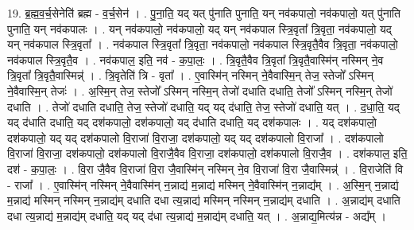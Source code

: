 \documentclass[17pt]{extarticle}
\begin{document}
19. ब्र॒ह्म॒व॒र्च॒सेनेति॑ ब्रह्म - व॒र्च॒सेन॑ । . पु॒ना॒ति॒ यद् यत् पु॑नाति पुनाति॒ यन् नव॑कपालो॒ नव॑कपालो॒ यत् पु॑नाति पुनाति॒ यन् नव॑कपालः । . यन् नव॑कपालो॒ नव॑कपालो॒ यद् यन् नव॑कपाल स्त्रि॒वृता᳚ त्रि॒वृता॒ नव॑कपालो॒ यद् यन् नव॑कपाल स्त्रि॒वृता᳚ । . नव॑कपाल स्त्रि॒वृता᳚ त्रि॒वृता॒ नव॑कपालो॒ नव॑कपाल स्त्रि॒वृतै॒वैव त्रि॒वृता॒ नव॑कपालो॒ नव॑कपाल स्त्रि॒वृतै॒व । . नव॑कपाल॒ इति॒ नव॑ - क॒पा॒लः॒ । . त्रि॒वृतै॒वैव त्रि॒वृता᳚ त्रि॒वृतै॒वास्मि॑न् नस्मिन् ने॒व त्रि॒वृता᳚ त्रि॒वृतै॒वास्मिन्न्॑ । . त्रि॒वृतेति॑ त्रि - वृता᳚ । . ए॒वास्मि॑न् नस्मिन् ने॒वैवास्मि॒न् तेज॒ स्तेजो᳚ ऽस्मिन् ने॒वैवास्मि॒न् तेजः॑ । . अ॒स्मि॒न् तेज॒ स्तेजो᳚ ऽस्मिन् नस्मि॒न् तेजो॑ दधाति दधाति॒ तेजो᳚ ऽस्मिन् नस्मि॒न् तेजो॑ दधाति । . तेजो॑ दधाति दधाति॒ तेज॒ स्तेजो॑ दधाति॒ यद् यद् द॑धाति॒ तेज॒ स्तेजो॑ दधाति॒ यत् । . द॒धा॒ति॒ यद् यद् द॑धाति दधाति॒ यद् दश॑कपालो॒ दश॑कपालो॒ यद् द॑धाति दधाति॒ यद् दश॑कपालः । . यद् दश॑कपालो॒ दश॑कपालो॒ यद् यद् दश॑कपालो वि॒राजा॑ वि॒राजा॒ दश॑कपालो॒ यद् यद् दश॑कपालो वि॒राजा᳚ । . दश॑कपालो वि॒राजा॑ वि॒राजा॒ दश॑कपालो॒ दश॑कपालो वि॒राजै॒वैव वि॒राजा॒ दश॑कपालो॒ दश॑कपालो वि॒राजै॒व । . दश॑कपाल॒ इति॒ दश॑ - क॒पा॒लः॒ । . वि॒रा जै॒वैव वि॒राजा॑ वि॒रा जै॒वास्मि॑न् नस्मिन् ने॒व वि॒राजा॑ वि॒रा जै॒वास्मिन्न्॑ । . वि॒राजेति॑ वि - राजा᳚ । . ए॒वास्मि॑न् नस्मिन् ने॒वैवास्मि॑न् न॒न्नाद्य॑ म॒न्नाद्य॑ मस्मिन् ने॒वैवास्मि॑न् न॒न्नाद्य᳚म् । . अ॒स्मि॒न् न॒न्नाद्य॑ म॒न्नाद्य॑ मस्मिन् नस्मिन् न॒न्नाद्य॑म् दधाति दधा त्य॒न्नाद्य॑ मस्मिन् नस्मिन् न॒न्नाद्य॑म् दधाति । . अ॒न्नाद्य॑म् दधाति दधा त्य॒न्नाद्य॑ म॒न्नाद्य॑म् दधाति॒ यद् यद् द॑धा त्य॒न्नाद्य॑ म॒न्नाद्य॑म् दधाति॒ यत् । . अ॒न्नाद्य॒मित्य॑न्न - अद्य᳚म् । \newline
\end{document}
